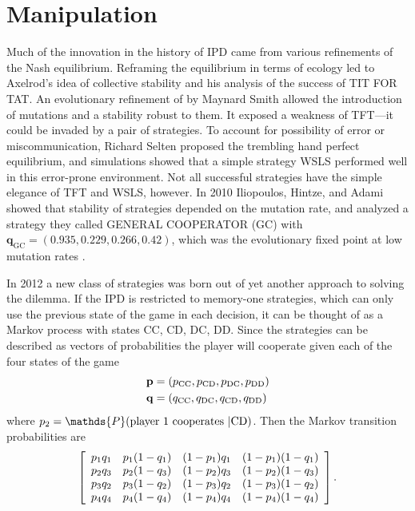 

\chapter{Manipulation}

Much of the innovation in the history of IPD came from various refinements of the Nash equilibrium. Reframing the equilibrium in terms of ecology led to Axelrod's idea of collective stability and his analysis of the success of TIT FOR TAT. An evolutionary refinement of by Maynard Smith allowed the introduction of mutations and a stability robust to them. It exposed a weakness of TFT---it could be invaded by a pair of strategies. To account for possibility of error or miscommunication, Richard Selten \cite{Selten_1975} proposed the trembling hand perfect equilibrium, and simulations showed that a simple strategy WSLS performed well in this error-prone environment. Not all successful strategies have the simple elegance of TFT and WSLS, however. In 2010 Iliopoulos, Hintze, and Adami showed that stability of strategies depended on the mutation rate, and analyzed a strategy they called GENERAL COOPERATOR (GC) with $\mathbf{q}_{\textrm{GC}} = (0.935, 0.229, 0.266, 0.42)$, which was the evolutionary fixed point at low mutation rates \cite{iliopoulos_2010}.

In 2012 a new class of strategies was born out of yet another approach to solving the dilemma. If the IPD is restricted to memory-one strategies, which can only use the previous state of the game in each decision, it can be thought of as a Markov process with states CC, CD, DC, DD. Since the strategies can be described as vectors of probabilities the player will cooperate given each of the four states of the game
\begin{align*}
\mathbf{p} &= (p_{\textrm{CC}}, p_{\textrm{CD}}, p_{\textrm{DC}}, p_{\textrm{DD}}) \\
\mathbf{q} &= (q_{\textrm{CC}}, q_{\textrm{DC}}, q_{\textrm{CD}}, q_{\textrm{DD}})
\end{align*}
where $p_2 = \mathds{P}(\textrm{player 1 cooperates } | \CD)$. Then the Markov transition probabilities are
\[
\left[
\begin{array}{c c c c}
p_1q_1 & p_1 (1-q_1) & (1-p_1)q_1 & (1-p_1)(1-q_1) \\
p_2q_3 & p_2 (1-q_3) & (1-p_2)q_3 & (1-p_2)(1-q_3) \\
p_3q_2 & p_3 (1-q_2) & (1-p_3)q_2 & (1-p_3)(1-q_2) \\
p_4q_4 & p_4 (1-q_4) & (1-p_4)q_4 & (1-p_4)(1-q_4)
\end{array}
\right]
.\]

